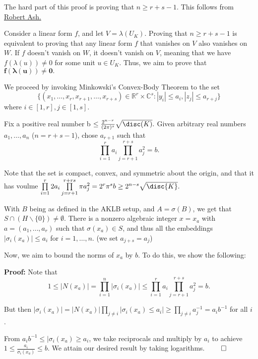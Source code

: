 \documentclass[a4paper, 12pt,oneside,openany]{book}
\begin{document}
The hard part of this proof is proving that $n \geq r+s-1$. This follows from \href{https://faculty.math.illinois.edu/~r-ash/Ant/AntChapter6.pdf}{Robert Ash.} 

Consider a linear form $f$, and let $V=\lambda(U_K).$ Proving that $n \geq r+s-1$ is equivalent to proving that any linear form $f$ that vanishes on $V$ also vanishes on $W$. If $f$ doesn't vanish on $W$, it doesn't vanish on $V$, meaning that we have $f(\lambda(u))\neq 0$ for some unit $u\in U_K.$ Thus, we aim to prove that $\mathbf{f(\lambda(u))\neq 0}.$

We proceed by invoking Minkowski's Convex-Body Theorem to the set $$\{(x_1, \dots, x_r, x_{r+1}, \dots, x_{r+s}) \in \mathbb{R}^r \times \mathbb{C}^s: |y_i| \leq a_i, |z_j| \leq a_{r+j}\}$$ where $i \in [1, r], j \in [1, s]$. 

Fix a positive real number b $\leq \frac{2^{n-r}}{(2\pi)^{s}} \sqrt{\disc(K)}.$ Given arbitrary real numbers $a_1, \dots, a_n$ ($n=r+s-1$), chose $a_{r+1}$ such that $$\prod\limits_{i=1}^{r}a_i \prod\limits_{j=r+1}^{r+s} a_j^2 = b.$$

Note that the set is compact, convex, and symmetric about the origin, and that it has voulme $\prod\limits_{i=1}^{r} 2a_i \prod\limits_{j=r+1}^{r+rs} \pi a_j^2 = 2^{r}\pi^{s}b \geq 2^{n-s}\sqrt{\disc{K}}.$

With $B$ being as defined in the AKLB setup, and $A=\sigma(B)$, we get that $S \cap (H \backslash \{0\}) \neq \emptyset.$ There is a nonzero algebraic integer $x=x_a$ with $a=(a_1, \dots, a_r)$ such that $\sigma(x_a) \in S$, and thus all the embeddings $|\sigma_i(x_a)| \leq a_i$ for $i = 1, \dots, n.$ (we set $a_{j+s}=a_j$)

Now, we aim to bound the norms of $x_a$ by $b$. To do this, we show the following:


\textbf{Proof:} Note that $$1 \leq |N(x_a)| = \prod\limits_{i=1}^n |\sigma_i(x_a)| \leq \prod\limits_{i=1}^r a_i \prod\limits_{j=r+1}^{r+s} a_j^2 = b.$$

But then $|\sigma_i(x_a)| = |N(x_a)| \prod\limits_{j\neq i} |\sigma_i(x_a) \leq a_i| \geq \prod\limits_{j\neq i} a_j^{-1} = a_ib^{-1}$ for all $i$. 

From $a_ib^{-1} \leq |\sigma_i(x_a) \geq a_i$, we take reciprocals and multiply by $a_i$ to achieve $1 \leq \frac{a_i}{\sigma_i(x_a)} \leq b$. We attain our desired result by taking logarithms. $\qed$
\end{document}
